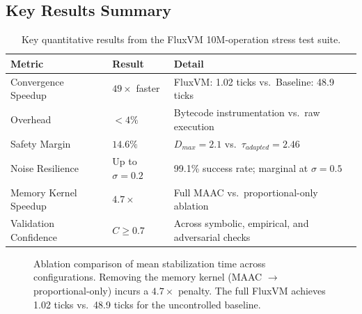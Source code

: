 \documentclass{article}
\begin{document}
\subsection*{Key Results Summary}
\begin{table}[h]
\centering
\renewcommand{\arraystretch}{1.3}
\begin{tabular}{@{}lll@{}}
\toprule
\textbf{Metric} & \textbf{Result} & \textbf{Detail} \\ \midrule
Convergence Speedup & $49\times$ faster & FluxVM: 1.02 ticks vs.\ Baseline: 48.9 ticks \\
Overhead & $<4\%$ & Bytecode instrumentation vs.\ raw execution \\
Safety Margin & $14.6\%$ & $D_{max}=2.1$ vs.\ $\tau_{adapted}=2.46$ \\
Noise Resilience & Up to $\sigma=0.2$ & 99.1\% success rate; marginal at $\sigma=0.5$ \\
Memory Kernel Speedup & $4.7\times$ & Full MAAC vs.\ proportional-only ablation \\
Validation Confidence & $C \ge 0.7$ & Across symbolic, empirical, and adversarial checks \\
\bottomrule
\end{tabular}
\caption{Key quantitative results from the FluxVM 10M-operation stress test suite.}
\label{tab:key_results}
\end{table}

\begin{figure}[h]
\centering
{}
\caption{Ablation comparison of mean stabilization time across configurations. Removing the memory kernel (MAAC $\to$ proportional-only) incurs a $4.7\times$ penalty. The full FluxVM achieves 1.02 ticks vs.\ 48.9 ticks for the uncontrolled baseline.}
\label{fig:ablation_bar}
\end{figure}
\end{document}
